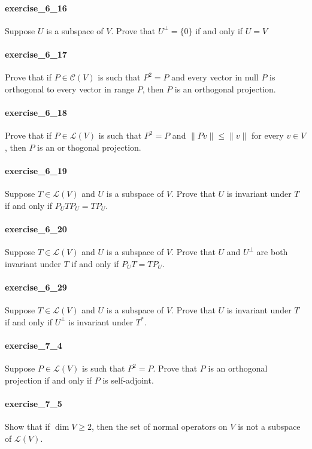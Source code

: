\documentclass{article}
\begin{document}
\paragraph{exercise\_6\_16} Suppose $U$ is a subspace of $V$. Prove that $U^{\perp}=\{0\}$ if and only if $U=V$

\paragraph{exercise\_6\_17} Prove that if $P \in \mathcal{C}(V)$ is such that $P^{2}=P$ and every vector in null $P$ is orthogonal to every vector in range $P$, then $P$ is an orthogonal projection.

\paragraph{exercise\_6\_18} Prove that if $P \in \mathcal{L}(V)$ is such that $P^{2}=P$ and $\|P v\| \leq\|v\|$ for every $v \in V$, then $P$ is an or thogonal projection.

\paragraph{exercise\_6\_19} Suppose $T \in \mathcal{L}(V)$ and $U$ is a subspace of $V$. Prove that $U$ is invariant under $T$ if and only if $P_{U} T P_{U}=T P_{U}$.

\paragraph{exercise\_6\_20} Suppose $T \in \mathcal{L}(V)$ and $U$ is a subspace of $V$. Prove that $U$ and $U^{\perp}$ are both invariant under $T$ if and only if $P_{U} T=T P_{U}$.

\paragraph{exercise\_6\_29} Suppose $T \in \mathcal{L}(V)$ and $U$ is a subspace of $V$. Prove that $U$ is invariant under $T$ if and only if $U^{\perp}$ is invariant under $T^{*}$.

\paragraph{exercise\_7\_4} Suppose $P \in \mathcal{L}(V)$ is such that $P^{2}=P$. Prove that $P$ is an orthogonal projection if and only if $P$ is self-adjoint.

\paragraph{exercise\_7\_5} Show that if $\operatorname{dim} V \geq 2$, then the set of normal operators on $V$ is not a subspace of $\mathcal{L}(V)$.
\end{document}
